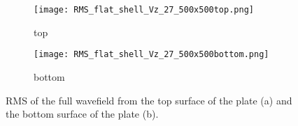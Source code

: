 \begin{figure} [h!]
	\centering
	\begin{subfigure}[b]{0.47\textwidth}
		\centering
		\texttt{[image: RMS\_flat\_shell\_Vz\_27\_500x500top.png]}
		\caption{top}
		\label{fig:rmstop}
	\end{subfigure}
	\hfill
	\begin{subfigure}[b]{0.47\textwidth}
		\centering
		\texttt{[image: RMS\_flat\_shell\_Vz\_27\_500x500bottom.png]}
		\caption{bottom}
		\label{fig:rmsbottom}
	\end{subfigure}
	\caption{RMS of the full wavefield from the top surface of the plate (a) and the bottom surface of the plate (b).}
\label{fig:rms}
\end{figure} 